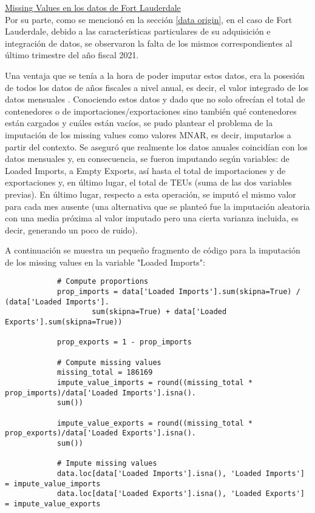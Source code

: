 \documentclass[12pt]{article}
\begin{document}
		\underline{Missing Values en los datos de Fort Lauderdale}\\
		Por su parte, como se mencionó en la sección \ref{data origin}, en el caso de Fort Lauderdale, debido a las características particulares de su adquisición e integración de datos, se observaron la falta de los mismos correspondientes al último trimestre del año fiscal 2021.
		
		
		Una ventaja que se tenía a la hora de poder imputar estos datos, era la posesión de todos los datos de años fiscales a nivel anual, es decir, el valor integrado de los datos mensuales \cite{waterborne2024commerce}. Conociendo estos datos y dado que no solo ofrecían el total de contenedores o de importaciones/exportaciones sino también qué contenedores están cargados y cuáles están vacíos, se pudo plantear el problema de la imputación de los missing values como valores MNAR, es decir, imputarlos a partir del contexto. Se aseguró que realmente los datos anuales coincidían con los datos mensuales y, en consecuencia, se fueron imputando según variables: de Loaded Imports, a Empty Exports, así hasta el total de importaciones y de exportaciones y, en último lugar, el total de TEUs (suma de las dos variables previas). En último lugar, respecto a esta operación, se imputó el mismo valor para cada mes ausente (una alternativa que se planteó fue la imputación aleatoria con una media próxima al valor imputado pero una cierta varianza incluida, es decir, generando un poco de ruido).
		
		A continuación se muestra un pequeño fragmento de código para la imputación de los missing values en la variable "Loaded Imports":
		
		\begin{verbatim}
			# Compute proportions
			prop_imports = data['Loaded Imports'].sum(skipna=True) / (data['Loaded Imports'].
					sum(skipna=True) + data['Loaded Exports'].sum(skipna=True))
					
			prop_exports = 1 - prop_imports
			
			# Compute missing values
			missing_total = 186169
			impute_value_imports = round((missing_total * prop_imports)/data['Loaded Imports'].isna().
			sum())
			
			impute_value_exports = round((missing_total * prop_exports)/data['Loaded Exports'].isna().
			sum())
			
			# Impute missing values
			data.loc[data['Loaded Imports'].isna(), 'Loaded Imports'] = impute_value_imports
			data.loc[data['Loaded Exports'].isna(), 'Loaded Exports'] = impute_value_exports
		\end{verbatim}
	
\end{document}
